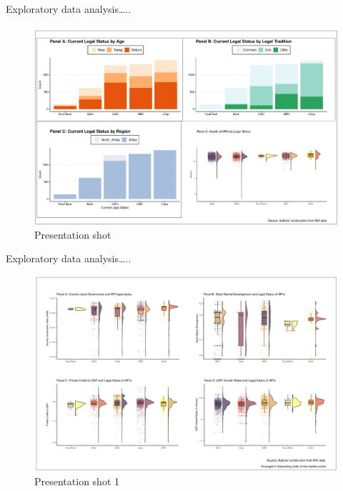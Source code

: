 \documentclass[
  ignorenonframetext,
]{beamer}
\begin{document}
\begin{frame}{Exploratory data analysis\ldots..}
\protect\hypertarget{exploratory-data-analysis..}{}
\begin{figure}
\centering
\includegraphics{presentation_shot.png}
\caption{Presentation shot}
\end{figure}
\end{frame}

\begin{frame}{Exploratory data analysis\ldots..}
\protect\hypertarget{exploratory-data-analysis..-1}{}
\begin{figure}
\centering
\includegraphics{presentation_shot1.png}
\caption{Presentation shot 1}
\end{figure}
\end{frame}
\end{document}
